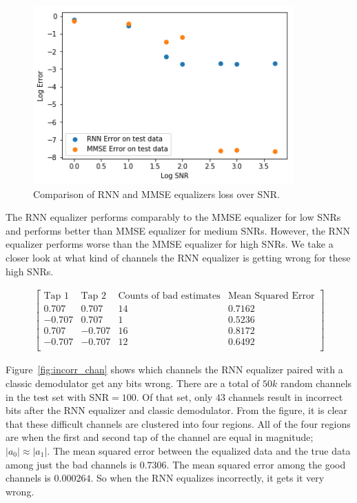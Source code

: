 \begin{figure}
\begin{center}
\includegraphics[width=100mm]{figures/equal/RNN_vs_MMSE.png}
\caption{Comparison of RNN and MMSE equalizers loss over SNR.}
\label{fig:rnn_vs_mmse}
\end{center}
\end{figure}

The RNN equalizer performs comparably to the MMSE equalizer for low SNRs and performs better than MMSE equalizer for medium SNRs.  However, the RNN equalizer performs worse than the MMSE equalizer for high SNRs.  We take a closer look at what kind of channels the RNN equalizer is getting wrong for these high SNRs.

\begin{align*}
\begin{bmatrix}
\text{Tap 1} & \text{Tap 2} & \text{Counts of bad estimates} & \text{Mean Squared Error}\\
\hline
0.707 & 0.707 & 14 & 0.7162\\
-0.707 & 0.707 & 1 & 0.5236\\
0.707 & -0.707 & 16 & 0.8172\\
-0.707 & -0.707 & 12 & 0.6492\\
\end{bmatrix}
\end{align*}

Figure~\ref{fig:incorr_chan} shows which channels the RNN equalizer paired with a classic demodulator get any bits wrong.  
There are a total of $50k$ random channels in the test set with SNR$=100$.
Of that set, only $43$ channels result in incorrect bits after the RNN equalizer and classic demodulator.
From the figure, it is clear that these difficult channels are clustered into four regions. All of the four regions are when the first and second tap of the channel are equal in magnitude; $|a_0|\approx |a_1|$.
The mean squared error between the equalized data and the true data among just the bad channels is $0.7306$.  The mean squared error among the good channels is $0.000264$. 
So when the RNN equalizes incorrectly, it gets it very wrong.

